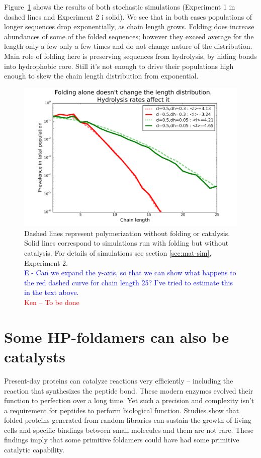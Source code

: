 \documentclass[journal=jacsat,manuscript=article,layout=twocolumn]{achemso}
\newcommand*{\red}[1]{\textcolor{red}{#1}}
\newcommand*{\blue}[1]{\textcolor{blue}{#1}}
\begin{document}
Figure~\ref{fig:sim.flory-fold} shows the results of both stochastic simulations (Experiment 1 in 
dashed lines and Experiment 2 i solid).
We see that in both cases populations of longer sequences drop exponentially, as chain length grows.
Folding does increase abundances of some of the folded sequences; however they exceed average 
for the length only a few only a few times and do not change nature of the 
distribution. Main role of folding here is preserving sequences from hydrolysis, by hiding bonds 
into hydrophobic core. Still it's not enough to drive their populations high enough to skew the 
chain length distribution from exponential.
\begin{figure}[h!]
  \centering
  \includegraphics[width=\columnwidth]{pictures/flory-and-fold.pdf} 
  \caption{Dashed lines represent polymerization without folding or catalysis. Solid lines 
correspond to simulations run with folding but without catalysis. For details of simulations see 
section \ref{sec:mat-sim}, Experiment 2. \\
\blue{E - Can we expand the y-axis, 
so that we can show what happens to the red dashed curve for chain length 25?  I've tried to 
estimate this in the text above.}\\
\red{Ken -- To be done}}
  \label{fig:sim.flory-fold}
\end{figure}

\section{Some HP-foldamers can also be catalysts}

Present-day proteins can catalyze reactions very efficiently -- including the reaction that 
synthesizes the peptide bond\cite{Stachelhaus1998}. These modern enzymes evolved their function to 
perfection over a long time. Yet such a precision and complexity isn't a requirement for peptides 
to perform biological function. Studies show that folded proteins generated from random libraries 
can sustain the growth of living cells\cite{Fisher2011} and specific bindings between 
small molecules and them are not rare\cite{Cherny2012}. 
These findings imply that some primitive foldamers could have had some primitive catalytic 
capability. 
\end{document}
